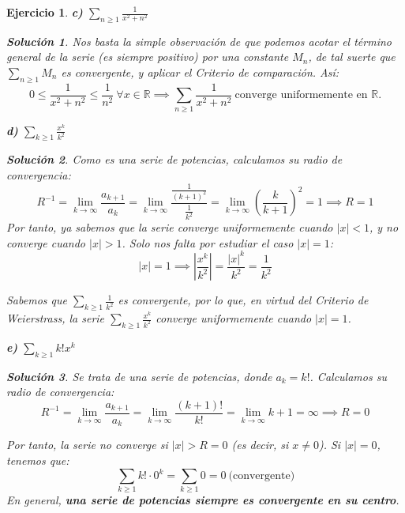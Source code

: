 \documentclass[11pt, a4paper]{article}
\newcommand\ddfrac[2]{\frac{\displaystyle #1}{\displaystyle #2}}
\theoremstyle{theorem-style}
\theoremstyle{definition-style}
\newtheorem{ejer}{Ejercicio}[section]
\theoremstyle{remark-style}
\newtheorem*{sol}{Solución}
\theoremstyle{example-style}
\begin{document}
\begin{ejer}
  \textbf{c)} $\displaystyle \sum_{n\geq1} \frac{1}{x^2+n^2}$

  \begin{sol}
    Nos basta la simple observación de que podemos acotar el término general de la serie (es siempre positivo) por una constante $M_n$, de tal suerte que $\sum_{n\ge1} M_n$ es convergente, y aplicar el \textit{Criterio de comparación}. Así: $$0 \le \frac{1}{x^2 + n^2} \le \frac{1}{n^2}\ \forall x \in \mathbb{R} \implies \sum_{n\ge 1} \frac{1}{x^2 + n^2} \ \text{converge uniformemente en } \mathbb{R}.$$
    
  \end{sol}

  \textbf{d)} $\displaystyle \sum_{k\geq1} \frac{x^k}{k^2}$

  \begin{sol}
    Como es una serie de potencias, calculamos su radio de convergencia: $$R^{-1} = \lim_{k\to\infty} \frac{a_{k+1}}{a_k} = \lim_{k\to\infty} \ddfrac{\frac{1}{(k+1)^2}}{\frac{1}{k^2}} = \lim_{k\to\infty} \left(\frac{k}{k+1}\right)^2 = 1 \implies R = 1$$
    Por tanto, ya sabemos que la serie converge uniformemente cuando $|x| < 1$, y no converge cuando $|x| > 1$. Solo nos falta por estudiar el caso $|x|=1$: $$|x| = 1 \implies \left| \frac{x^k}{k^2} \right| = \frac{|x|^k}{k^2} = \frac{1}{k^2}$$
    
    Sabemos que $\displaystyle \sum_{k\ge1} \frac{1}{k^2}$ es convergente, por lo que, en virtud del \textit{Criterio de Weierstrass}, la serie $\displaystyle \sum_{k\ge1}\frac{x^k}{k^2}$ converge uniformemente cuando $|x| = 1$.
  \end{sol}

  \textbf{e)} $\displaystyle \sum_{k\geq1} k! x^k$

  \begin{sol}
    Se trata de una serie de potencias, donde $a_k = k!$. Calculamos su radio de convergencia: $$R^{-1} = \lim_{k\to\infty} \frac{a_{k+1}}{a_k} = \lim_{k\to\infty} \frac{(k+1)!}{k!} = \lim_{k\to\infty} k + 1 = \infty \implies R=0$$
    
    Por tanto, la serie no converge si $|x| > R = 0$ (es decir, si $x\ne 0$). Si $|x| = 0$, tenemos que: $$\sum_{k\ge1} k! \cdot0^k = \sum_{k\ge1} 0 = 0 \ \text{(convergente)}$$
    En general, \textbf{una serie de potencias siempre es convergente en su centro}.
  \end{sol}
\end{ejer}
\end{document}
